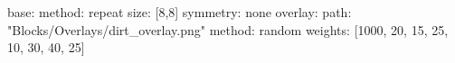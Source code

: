base:
  method: repeat
  size: [8,8]
  symmetry: none
overlay:
  path: "Blocks/Overlays/dirt_overlay.png"
  method: random
  weights: [1000, 20, 15, 25, 10, 30, 40, 25]

